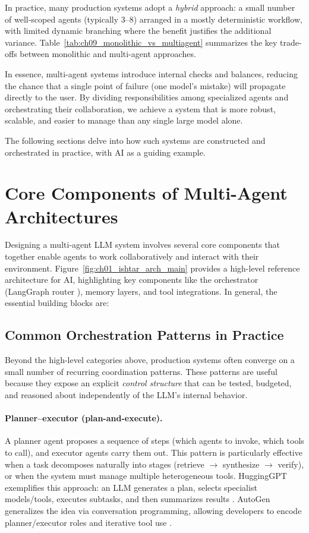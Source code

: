 \noindent In practice, many production systems adopt a \emph{hybrid} approach: a small number of well-scoped agents (typically 3--8) arranged in a mostly deterministic workflow, with limited dynamic branching where the benefit justifies the additional variance. Table~\ref{tab:ch09_monolithic_vs_multiagent} summarizes the key trade-offs between monolithic and multi-agent approaches.

In essence, multi-agent systems introduce internal checks and balances, reducing the chance that a single point of failure (one model's mistake) will propagate directly to the user. By dividing responsibilities among specialized agents and orchestrating their collaboration, we achieve a system that is more robust, scalable, and easier to manage than any single large model alone.  

The following sections delve into how such systems are constructed and orchestrated in practice, with \ishtar{} AI as a guiding example.

\section{Core Components of Multi-Agent Architectures}

Designing a multi-agent LLM system involves several core components that together enable agents to work collaboratively and interact with their environment. Figure~\ref{fig:ch01_ishtar_arch_main} provides a high-level reference architecture for \ishtar{} AI, highlighting key components like the orchestrator (LangGraph router \cite{langchain}), memory layers, and tool integrations. In general, the essential building blocks are:  





\subsection{Common Orchestration Patterns in Practice}
\label{sec:orch-patterns}
Beyond the high-level categories above, production systems often converge on a small number of recurring coordination patterns.
These patterns are useful because they expose an explicit \emph{control structure} that can be tested, budgeted, and reasoned about independently of the LLM's internal behavior.

\paragraph{Planner--executor (plan-and-execute).}
A planner agent proposes a sequence of steps (which agents to invoke, which tools to call), and executor agents carry them out.
This pattern is particularly effective when a task decomposes naturally into stages (retrieve $\rightarrow$ synthesize $\rightarrow$ verify), or when the system must manage multiple heterogeneous tools.
HuggingGPT exemplifies this approach: an LLM generates a plan, selects specialist models/tools, executes subtasks, and then summarizes results \cite{Shen2023HuggingGPT}.
AutoGen generalizes the idea via conversation programming, allowing developers to encode planner/executor roles and iterative tool use \cite{Wu2023AutoGen}.

